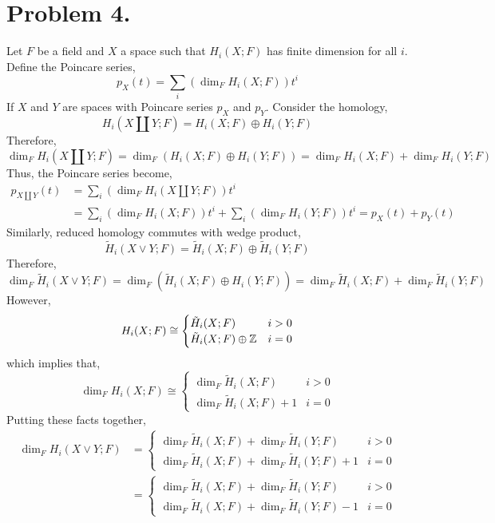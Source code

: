 \documentclass[12pt]{extarticle}
\begin{document}
\section*{Problem 4.}

Let $F$ be a field and $X$ a space such that $H_i(X ; F)$ has finite dimension for all $i$. Define the Poincare series,
\[ p_X(t) = \sum_{i} \left( \dim_F{H_i(X ; F)} \right) t^i \]
If $X$ and $Y$ are spaces with Poincare series $p_X$ and $p_Y$. Consider the homology,
\[ H_i(X \coprod Y ; F) = H_i(X ; F) \oplus H_i(Y ; F) \]
Therefore,
\[ \dim_{F} {H_i(X \coprod Y ; F)} = \dim_{F} {\left( H_i(X ; F) \oplus H_i(Y ; F) \right)} = \dim_{F}{ H_i(X ; F) } + \dim_{F}{ H_i(Y ; F) } \]
Thus, the Poincare series become,
\begin{align*} 
p_{X \coprod Y} (t) & = \sum_{i} \left( \dim_F{H_i(X \coprod Y ; F)} \right) t^i
\\
& = \sum_{i} \left( \dim_{F}{ H_i(X ; F) } \right) t^i + \sum_{i} \left( \dim_{F}{ H_i(Y ; F) } \right) t^i = p_X(t) + p_Y(t) 
\end{align*}
Similarly, reduced homology commutes with wedge product,
\[ \tilde{H}_i(X \vee Y ; F) = \tilde{H}_i(X ; F) \oplus \tilde{H}_i(Y ; F) \]
Therefore, 
\[ \dim_{F} {\tilde{H}_i(X \vee Y ; F)} = \dim_{F} {\left( \tilde{H}_i(X ; F) \oplus H_i(Y ; F) \right)} = \dim_{F}{ \tilde{H}_i(X ; F) } + \dim_{F}{ \tilde{H}_i(Y ; F) } \]
However,
\[ H_i(X ; F) \cong 
\begin{cases}
\tilde{H}_i(X ; F) & i > 0 
\\
\tilde{H}_i(X ; F) \oplus \mathbb{Z} & i = 0
\end{cases}
\]
which implies that,
\[ \dim_{F} { H_i(X ; F) } \cong 
\begin{cases}
\dim_{F} { \tilde{H}_i(X ; F) } & i > 0 
\\
\dim_{F} { \tilde{H}_i(X ; F) } + 1 & i = 0
\end{cases}
\]
Putting these facts together,
\begin{align*}
\dim_F { H_i(X \vee Y ; F) } & =
\begin{cases}
\dim_{F}{ \tilde{H}_i(X ; F) } + \dim_{F}{ \tilde{H}_i(Y ; F) } & i > 0
\\
\dim_{F}{ \tilde{H}_i(X ; F) } + \dim_{F}{ \tilde{H}_i(Y ; F) } + 1 & i = 0
\end{cases}
\\
& = 
\begin{cases}
\dim_{F}{ \tilde{H}_i(X ; F) } + \dim_{F}{ \tilde{H}_i(Y ; F) } & i > 0
\\
\dim_{F}{ \tilde{H}_i(X ; F) } + \dim_{F}{ \tilde{H}_i(Y ; F) } - 1 & i = 0
\end{cases}
\end{align*}
\end{document}
